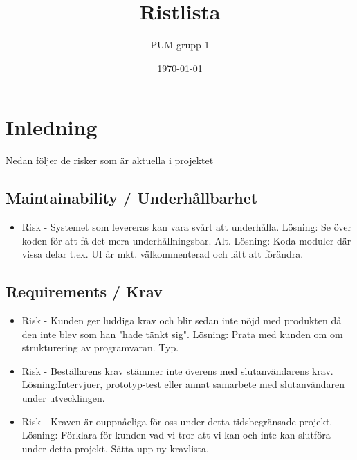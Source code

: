 

\ifpdf
\else
\fi

\title{Ristlista}
\author{PUM-grupp 1}
\date{\today}



\maketitle\thispagestyle{empty}

\newpage

\setcounter{tocdepth}{2}
\tableofcontents
\newpage

\section{Inledning}
Nedan följer de risker som är aktuella i projektet

\subsection{Maintainability / Underhållbarhet}
\begin{itemize}
\item Risk - Systemet som levereras kan vara svårt att underhålla.
Lösning: Se över koden för att få det mera underhållningsbar.
Alt. Lösning: Koda moduler där vissa delar t.ex. UI är mkt. välkommenterad och lätt att förändra.
\end{itemize}

\subsection{Requirements / Krav}
\begin{itemize}
\item Risk - Kunden ger luddiga krav och blir sedan inte nöjd med produkten då den inte blev som han "hade tänkt sig".
Lösning: Prata med kunden om om strukturering av programvaran. Typ.
\item Risk - Beställarens krav stämmer inte överens med slutanvändarens krav.
Lösning:Intervjuer, prototyp-test eller annat samarbete med slutanvändaren under utvecklingen.
\item Risk - Kraven är ouppnåeliga för oss under detta tidsbegränsade projekt.
Lösning: Förklara för kunden vad vi tror att vi kan och inte kan slutföra under detta projekt. Sätta upp ny kravlista.
\end{itemize}

